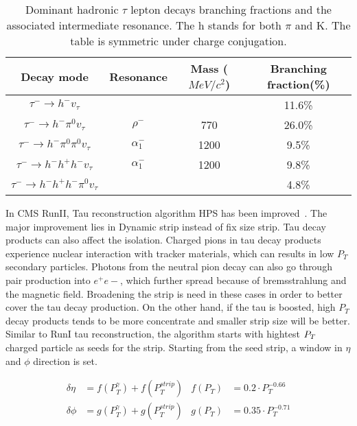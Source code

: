 \begin{table}[htp]
\caption{Dominant hadronic $\tau$ lepton decays branching fractions and the associated intermediate resonance. The h stands for both $\pi$ and K. The table is symmetric under charge conjugation.}\label{tb:tauHdecay}
\begin{center}
\begin{tabular}{|c|c|c|c|}
\hline
Decay mode                                             & Resonance & Mass ($MeV/c^{2}$) & Branching fraction(\%)\\\hline
$\tau^{-}\to h^{-}v_{\tau}$                                     &                                  &           &  11.6\%     \\
$\tau^{-}\to h^{-}\pi^{0} v_{\tau}$                       & $\rho^{-}$                 & 770     &   26.0\%      \\
$\tau^{-}\to h^{-}\pi^{0} \pi^{0}  v_{\tau}$       & $\alpha_{1}^{-}$       & 1200   &   9.5\%     \\
$\tau^{-}\to h^{-}h^{+}h^{-}v_{\tau}$                     & $\alpha_{1}^{-}$       &  1200  &   9.8\%  \\
$\tau^{-}\to h^{-}h^{+}h^{-}\pi^{0} v_{\tau}$      &                                  &            &   4.8\% \\\hline
 \end{tabular}
\end{center}
\end{table}


In CMS RunII, Tau reconstruction algorithm HPS has been improved~\cite{TauRecoandIDRunII}. The major improvement lies in Dynamic strip instead of fix size strip. Tau decay products can also affect the isolation. Charged pions in tau decay products experience nuclear interaction with tracker materials, which can results in low $P_{T}$ secondary particles. Photons from the neutral pion decay can also go through pair production into $e^{+}e{-}$, which further spread because of bremsstrahlung and the magnetic field. Broadening the strip is need in these cases in order to better cover the tau decay production. On the other hand, if the tau is boosted, high $P_{T}$ decay products tends to be more concentrate and smaller strip size will be better. Similar to RunI tau reconstruction, the algorithm starts with hightest $P_{T}$ charged particle as seeds for the strip. Starting from the seed strip, a window in $\eta$ and $\phi$ direction is set.  

\begin{align*}
\delta\eta&=f(P_{T}^{\gamma})+f(P_{T}^{strip})   & f(P_{T})&=0.2\cdot P_{T}^{-0.66}\\
\delta\phi&=g(P_{T}^{\gamma})+g(P_{T}^{strip}) & g(P_{T})&=0.35\cdot P_{T}^{-0.71}\\
\end{align*}

